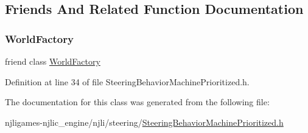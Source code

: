 \subsection{Friends And Related Function Documentation}
\mbox{\label{classnjli_1_1_steering_behavior_machine_prioritized_acb96ebb09abe8f2a37a915a842babfac}} 
\subsubsection{\texorpdfstring{World\+Factory}{WorldFactory}}
{\footnotesize\ttfamily friend class \mbox{\hyperlink{classnjli_1_1_world_factory}{World\+Factory}}\hspace{0.3cm}{\ttfamily [friend]}}



Definition at line 34 of file Steering\+Behavior\+Machine\+Prioritized.\+h.



The documentation for this class was generated from the following file\+:\begin{DoxyCompactItemize}
\item 
njligames-\/njlic\+\_\+engine/njli/steering/\mbox{\hyperlink{_steering_behavior_machine_prioritized_8h}{Steering\+Behavior\+Machine\+Prioritized.\+h}}\end{DoxyCompactItemize}
